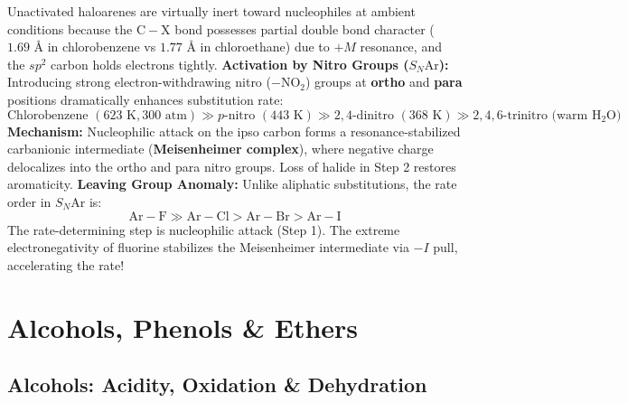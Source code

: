 \documentclass[10pt,a4paper]{article}
\begin{document}
\begin{conceptbox}
Unactivated haloarenes are virtually inert toward nucleophiles at ambient conditions because the $\mathrm{C-X}$ bond possesses partial double bond character ($1.69\text{ \AA}$ in chlorobenzene vs $1.77\text{ \AA}$ in chloroethane) due to $+M$ resonance, and the $sp^2$ carbon holds electrons tightly.
\textbf{Activation by Nitro Groups ($S_N\mathrm{Ar}$):}
Introducing strong electron-withdrawing nitro ($-\mathrm{NO_2}$) groups at \textbf{ortho} and \textbf{para} positions dramatically enhances substitution rate:
\begin{equation}
  \text{Chlorobenzene } (623\text{ K}, 300\text{ atm}) \gg p\text{-nitro } (443\text{ K}) \gg 2,4\text{-dinitro } (368\text{ K}) \gg 2,4,6\text{-trinitro (warm } \mathrm{H_2O})
\end{equation}
\textbf{Mechanism:} Nucleophilic attack on the ipso carbon forms a resonance-stabilized carbanionic intermediate (\textbf{Meisenheimer complex}), where negative charge delocalizes into the ortho and para nitro groups. Loss of halide in Step 2 restores aromaticity.
\textbf{Leaving Group Anomaly:} Unlike aliphatic substitutions, the rate order in $S_N\mathrm{Ar}$ is:
\begin{equation}
  \mathrm{Ar-F} \gg \mathrm{Ar-Cl} > \mathrm{Ar-Br} > \mathrm{Ar-I}
\end{equation}
The rate-determining step is nucleophilic attack (Step 1). The extreme electronegativity of fluorine stabilizes the Meisenheimer intermediate via $-I$ pull, accelerating the rate!
\end{conceptbox}

\section{Alcohols, Phenols \& Ethers}

\subsection{Alcohols: Acidity, Oxidation \& Dehydration}
\end{document}
